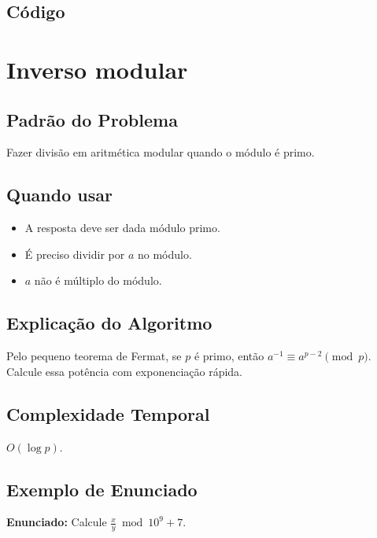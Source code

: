\subsection{Código}

\section{Inverso modular}

\subsection{Padrão do Problema}
Fazer divisão em aritmética modular quando o módulo é primo.

\subsection{Quando usar}
\begin{itemize}[nosep]
  \item A resposta deve ser dada módulo primo.
  \item É preciso dividir por $a$ no módulo.
  \item $a$ não é múltiplo do módulo.
\end{itemize}

\subsection{Explicação do Algoritmo}
Pelo pequeno teorema de Fermat, se $p$ é primo, então $a^{-1}\equiv a^{p-2}\pmod p$. Calcule essa potência com exponenciação rápida.

\subsection{Complexidade Temporal}
$O(\log p)$.

\subsection{Exemplo de Enunciado}
\begin{exemplodiabox}
\textbf{Enunciado:} Calcule $\frac{x}{y} \bmod 10^9+7$.
\end{exemplodiabox}

